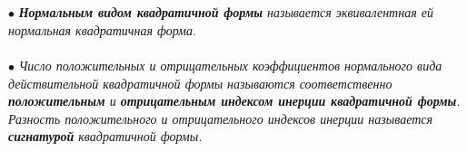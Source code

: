 \begin{Proof}
\end{Proof}\\\\
$\bullet$ \textit{\textbf{Нормальным видом квадратичной формы} называется эквивалентная ей нормальная квадратичная форма}.\\\\
$\bullet$ \textit{Число положительных и отрицательных коэффициентов нормального вида действительной квадратичной формы называются соответственно \textbf{положительным} и \textbf{отрицательным индексом инерции квадратичной формы}. Разность положительного и отрицательного индексов инерции называется \textbf{сигнатурой} квадратичной формы.}












